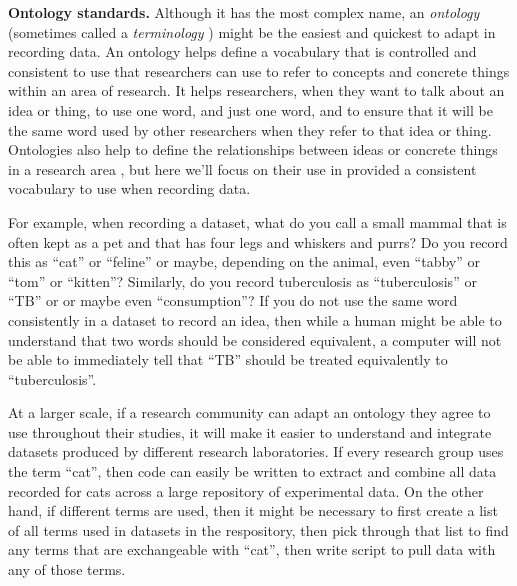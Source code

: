 \documentclass[]{tufte-book}
\begin{document}
\textbf{Ontology standards.} Although it has the most complex name, an \emph{ontology}
(sometimes called a \emph{terminology} \citep{sansone2012toward}) might be the easiest and
quickest to adapt in recording data. An ontology helps define a vocabulary that
is controlled and consistent to use that researchers can use to refer to
concepts and concrete things within an area of research. It helps researchers,
when they want to talk about an idea or thing, to use one word, and just one
word, and to ensure that it will be the same word used by other researchers when
they refer to that idea or thing. Ontologies also help to define the relationships
between ideas or concrete things in a research area \citep{ghosh2011software}, but
here we'll focus on their use in provided a consistent vocabulary to use when
recording data.

For example, when recording a dataset, what do you call a small mammal that is
often kept as a pet and that has four legs and whiskers and purrs? Do you record
this as ``cat'' or ``feline'' or maybe, depending on the animal, even ``tabby'' or
``tom'' or ``kitten''? Similarly, do you record tuberculosis as ``tuberculosis'' or
``TB'' or or maybe even ``consumption''? If you do not use the same word
consistently in a dataset to record an idea, then while a human might be able to
understand that two words should be considered equivalent, a computer will not
be able to immediately tell that ``TB'' should be treated equivalently to
``tuberculosis''.

At a larger scale, if a research community can adapt an ontology they agree to
use throughout their studies, it will make it easier to understand and integrate
datasets produced by different research laboratories. If every research group
uses the term ``cat'', then code can easily be written to extract and combine
all data recorded for cats across a large repository of experimental data.
On the other hand, if different terms are used, then it might be necessary to
first create a list of all terms used in datasets in the respository, then pick
through that list to find any terms that are exchangeable with ``cat'', then write
script to pull data with any of those terms.
\end{document}
